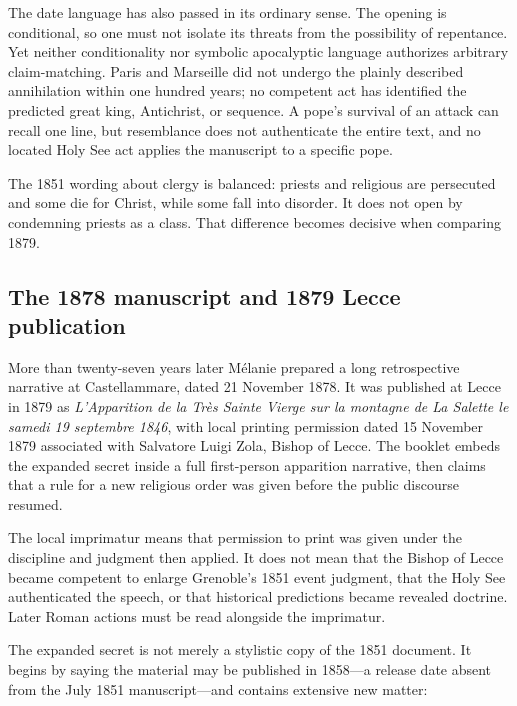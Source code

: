 The date language has also passed in its ordinary sense. The opening is conditional, so one must not isolate its threats from the possibility of repentance. Yet neither conditionality nor symbolic apocalyptic language authorizes arbitrary claim-matching. Paris and Marseille did not undergo the plainly described annihilation within one hundred years; no competent act has identified the predicted great king, Antichrist, or sequence. A pope's survival of an attack can recall one line, but resemblance does not authenticate the entire text, and no located Holy See act applies the manuscript to a specific pope.

The 1851 wording about clergy is balanced: priests and religious are persecuted and some die for Christ, while some fall into disorder. It does not open by condemning priests as a class. That difference becomes decisive when comparing 1879.

\subsection{The 1878 manuscript and 1879 Lecce publication}

More than twenty-seven years later Mélanie prepared a long retrospective narrative at Castellammare, dated 21 November 1878. It was published at Lecce in 1879 as \emph{L'Apparition de la Très Sainte Vierge sur la montagne de La Salette le samedi 19 septembre 1846}, with local printing permission dated 15 November 1879 associated with Salvatore Luigi Zola, Bishop of Lecce. The booklet embeds the expanded secret inside a full first-person apparition narrative, then claims that a rule for a new religious order was given before the public discourse resumed.

The local imprimatur means that permission to print was given under the discipline and judgment then applied. It does not mean that the Bishop of Lecce became competent to enlarge Grenoble's 1851 event judgment, that the Holy See authenticated the speech, or that historical predictions became revealed doctrine. Later Roman actions must be read alongside the imprimatur.

The expanded secret is not merely a stylistic copy of the 1851 document. It begins by saying the material may be published in 1858---a release date absent from the July 1851 manuscript---and contains extensive new matter:

